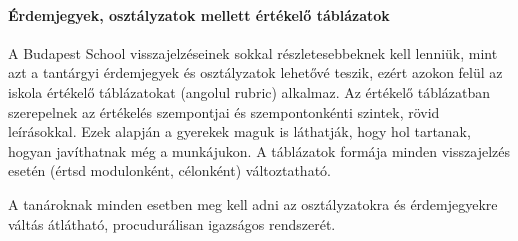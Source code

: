 \paragraph{Érdemjegyek, osztályzatok mellett értékelő táblázatok} A
Budapest
School visszajelzéseinek sokkal részletesebbeknek kell lenniük, mint azt a tantárgyi érdemjegyek és osztályzatok lehetővé teszik, ezért azokon felül az iskola értékelő táblázatokat (angolul rubric) alkalmaz. Az értékelő táblázatban szerepelnek az értékelés szempontjai és szempontonkénti szintek, rövid leírásokkal. Ezek alapján a gyerekek maguk is láthatják, hogy hol tartanak, hogyan javíthatnak még a munkájukon. A táblázatok formája minden visszajelzés esetén (értsd modulonként, célonként) változtatható.

A tanároknak minden esetben meg kell adni az osztályzatokra és érdemjegyekre váltás átlátható, procudurálisan igazságos rendszerét.


